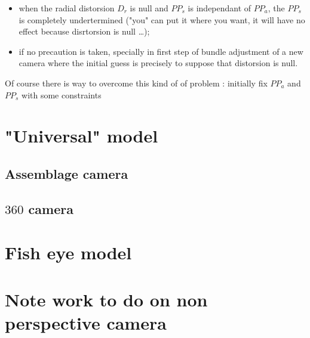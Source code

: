 \begin{itemize}
   \item when the radial distorsion $D_r$ is null and $PP_s$ is independant of $PP_a$, the 
         $PP_s$ is completely undertermined ("you" can put it where you want, it will have no 
         effect because disrtorsion is null \dots);

   \item  if no precaution is taken, specially in first step of bundle adjustment 
          of a new camera where the initial guess is precisely to suppose that distorsion
          is null.
\end{itemize}

Of course there is way to overcome this kind of of problem : 
initially fix $PP_a$ and $PP_s$ with some constraints




\section{"Universal" model}

\subsection{Assemblage camera}
\subsection{$360$ camera}

\section{Fish eye model}
\label{SecFE}



\section{Note work to do on non perspective camera}




%
%
%


